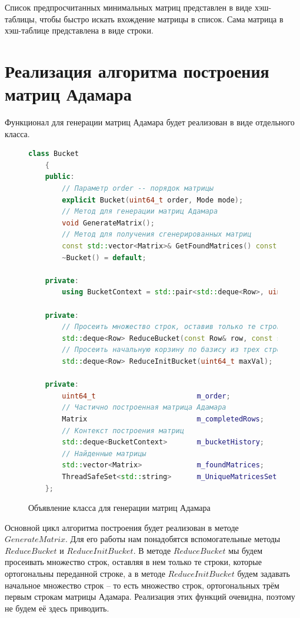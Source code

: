 Список предпросчитанных минимальных матриц представлен в виде хэш-таблицы, чтобы быстро искать вхождение матрицы в список. Сама матрица в хэш-таблице представлена в виде строки.

\section{Реализация алгоритма построения матриц Адамара}
\label{builder_s}

Функционал для генерации матриц Адамара будет реализован в виде отдельного класса.

\begin{figure}[H]
    \centering
    \begin{minipage}{\linewidth}
    \begin{lstlisting}[language=c++, tabsize=4, showspaces=false, basicstyle=\fontsize{9.5}{9.5}\selectfont, numbers=none]
    class Bucket
    {
    public:
        // Параметр order -- порядок матрицы
        explicit Bucket(uint64_t order, Mode mode);
        // Метод для генерации матриц Адамара
        void GenerateMatrix();
        // Метод для получения сгенерированных матриц
        const std::vector<Matrix>& GetFoundMatrices() const;
        ~Bucket() = default;
    
    private:
        using BucketContext = std::pair<std::deque<Row>, uint64_t>;
    
    private:
        // Просеить множество строк, оставив только те строки, что ортогональны строке row
        std::deque<Row> ReduceBucket(const Row& row, const std::deque<Row>& vec);
        // Просеить начальную корзину по базису из трех строк
        std::deque<Row> ReduceInitBucket(uint64_t maxVal);
    
    private:
        uint64_t                        m_order;
        // Частично построенная матрица Адамара
        Matrix                          m_completedRows;
        // Контекст построения матриц
        std::deque<BucketContext>       m_bucketHistory;
        // Найденные матрицы
        std::vector<Matrix>             m_foundMatrices;
        ThreadSafeSet<std::string>      m_UniqueMatricesSet;
    };
    \end{lstlisting}
    \end{minipage}
    \caption{Объявление класса для генерации матриц Адамара}
    \label{alg:builder_definition}
\end{figure}

Основной цикл алгоритма построения будет реализован в методе $GenerateMatrix$. Для его работы нам понадобятся вспомогательные методы $ReduceBucket$ и $ReduceInitBucket$. В методе $ReduceBucket$ мы будем просеивать множество строк, оставляя в нем только те строки, которые ортогональны переданной строке, а в методе $ReduceInitBucket$ будем задавать начальное множество строк -- то есть множество строк, ортогональных трём первым строкам матрицы Адамара. Реализация этих функций очевидна, поэтому не будем её здесь приводить.

